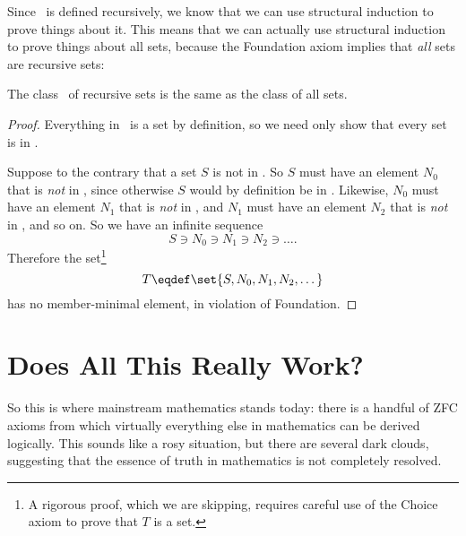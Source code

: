 Since \recset\ is defined recursively, we know that we can use
structural induction to prove things about it.  This means that
we can actually use structural induction to prove things about all
sets, because the Foundation axiom implies that \emph{all} sets are
recursive sets:

\begin{theorem}\label{thm_recursive_sets}
The class \recset\ of recursive sets is the same as the class of all
sets.
\end{theorem}

\begin{proof}
Everything in \recset\ is a set by definition, so we need only show
that every set is in \recset.

Suppose to the contrary that a set $S$ is not in \recset.  So $S$ must
have an element $N_0$ that is \emph{not} in \recset, since otherwise
$S$ would by definition be in \recset.  Likewise, $N_0$ must have an
element $N_1$ that is \emph{not} in \recset, and $N_1$ must have an
element $N_2$ that is \emph{not} in \recset, and so on.  So we have an
infinite sequence
\[
S \ni N_0 \ni N_1 \ni N_2 \ni \dots.
\]
Therefore the set\footnote{A rigorous proof, which we are skipping,
  requires careful use of the Choice axiom to prove that $T$ is a
  set.}
\[
T \eqdef \set{S,N_0, N_1, N_2, \dots}
\]
has no member-minimal element, in violation of Foundation.
\end{proof}

\begin{problems}
\practiceproblems
{}

\classproblems
{}

\homeworkproblems
{}


\examproblems
{}
\end{problems}

\section{Does All This Really Work?}\label{setsreallywork}

So this is where mainstream mathematics stands today: there is a
handful of ZFC axioms from which virtually everything else in
mathematics can be derived logically.  This sounds like a rosy
situation, but there are several dark clouds, suggesting that the
essence of truth in mathematics is not completely resolved.

